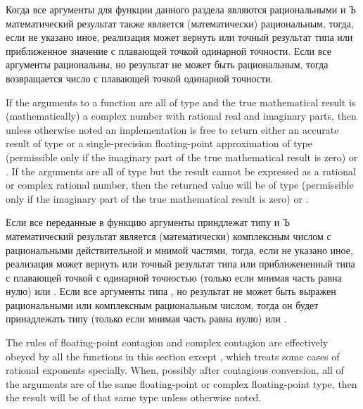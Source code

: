Когда все аргументы для функции данного раздела являются рациональными и Ъ
математический результат также является (математически) рациональным, тогда,
если не указано иное, реализация может вернуть или точный результат типа
 или приближенное значение с плавающей точкой одинарной точности.
Если все аргументы рациональны, но результат не может быть рациональным, тогда
возвращается число с плавающей точкой одинарной точности.

If the arguments to a function are all of type
 and the true mathematical result
is (mathematically) a complex number with rational real
and imaginary parts, then unless otherwise noted
an implementation is free to return either an accurate result of
type 
or a single-precision floating-point approximation
of type  (permissible only if the imaginary part
of the true mathematical result is zero) or .
If the arguments are all of type
 but the result cannot be expressed
as a rational or complex rational number, then the returned value
will be of type  (permissible only if the imaginary part
of the true mathematical result is zero) or .

Если все переданные в функцию аргументы приндлежат типу  и Ъ математический результат является (математически)
комплексным числом с рациональными действительной и мнимой частями, тогда, если
не указано иное, реализация может вернуть или точный результат типа  или приближененный типа с плавающей точкой с
одинарной точностью  (только если мнимая часть равна нулю) или 
 .
Если все аргументы типа , но результат не
может быть выражен рациональными или комплексным рациональным числом, тогда он
будет принадлежать типу  (только если мнимая часть равна нулю)
или .

The rules of floating-point contagion and complex contagion are 
effectively obeyed by all the functions in this section except ,
which treats some cases of rational exponents specially.
When, possibly after contagious conversion, all of the arguments are of
the same floating-point or complex floating-point type,
then the result will be of that same type unless otherwise noted.


